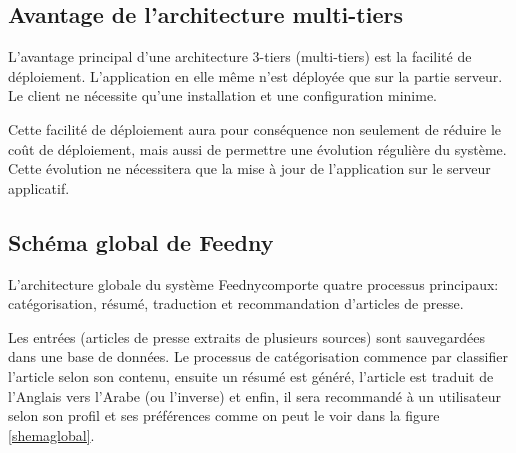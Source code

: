 \subsection{Avantage de l'architecture multi-tiers}
L'avantage principal d'une architecture 3-tiers (multi-tiers) est la facilité de déploiement. L'application
en elle même n'est déployée que sur la partie serveur. Le client ne nécessite qu'une installation et une configuration minime. 

Cette facilité de déploiement aura pour conséquence non seulement de réduire le coût de déploiement, mais aussi de permettre une évolution régulière du système. Cette évolution ne nécessitera que la mise à jour de l'application sur le serveur applicatif.

\subsection{Schéma global de \textquotedbl Feedny\textquotedbl}
L'architecture globale du système \textquotedbl Feedny\textquotedbl  comporte quatre processus principaux: catégorisation, résumé, traduction et recommandation d'articles de presse.

Les entrées (articles de presse extraits de plusieurs sources) sont sauvegardées dans une base de données. Le processus de catégorisation commence par classifier l'article selon son contenu, ensuite un résumé est généré, l'article est traduit de l'Anglais vers l'Arabe (ou l'inverse) et enfin, il sera recommandé à un utilisateur selon son profil et ses préférences comme on peut le voir dans la figure \ref{shemaglobal}.

